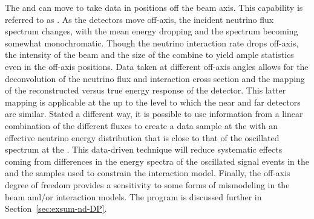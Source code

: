 The  and  can move to take data in positions off the beam axis.  This capability is referred to as . As the detectors move off-axis, the incident neutrino flux spectrum changes, with the mean energy dropping and the spectrum becoming somewhat monochromatic.  Though the neutrino interaction rate drops off-axis, the intensity of the beam and the size of the   combine to yield ample statistics even in the off-axis positions.
Data taken at different off-axis angles allows for the deconvolution of the neutrino flux and interaction cross section and the mapping of the reconstructed versus true energy response of the detector.  This latter mapping is applicable at the  up to the level to which the near and far  detectors are similar.  Stated a different way, it is possible to use information from a linear combination of the different fluxes to create a data sample at the  with an effective neutrino energy distribution that is close to that of the oscillated spectrum at the .  This data-driven technique will reduce systematic effects coming from differences in the energy spectra of the oscillated signal events in the  and the  samples used to constrain the interaction model. Finally, the off-axis degree of freedom provides a sensitivity to some forms of mismodeling in the beam and/or interaction models. The  program is discussed further in Section~\ref{sec:exsum-nd-DP}.

